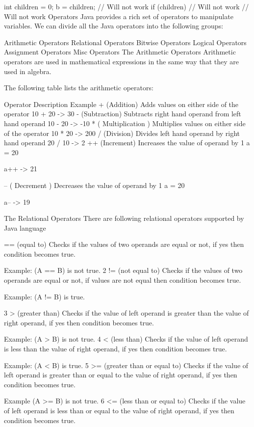 int children = 0;
b = children; // Will not work
if (children) { // Will not work
    // Will not work
}
Operators
Java provides a rich set of operators to manipulate variables. We can divide all the Java operators into the following groups:

Arithmetic Operators
Relational Operators
Bitwise Operators
Logical Operators
Assignment Operators
Misc Operators
The Arithmetic Operators
Arithmetic operators are used in mathematical expressions in the same way that they are used in algebra.

The following table lists the arithmetic operators:

Operator	Description	Example
+ (Addition)	Adds values on either side of the operator	10 + 20 -> 30
- (Subtraction)	Subtracts right hand operand from left hand operand	10 - 20 -> -10
* ( Multiplication )	Multiplies values on either side of the operator	10 * 20 -> 200
/ (Division)	Divides left hand operand by right hand operand	20 / 10 -> 2
++ (Increment)	Increases the value of operand by 1
a = 20

a++ -> 21

-- ( Decrement )	Decreases the value of operand by 1
a = 20

a-- -> 19

The Relational Operators
There are following relational operators supported by Java language

== (equal to) Checks if the values of two operands are equal or not, if yes then condition becomes true.

Example: (A == B) is not true. 2 != (not equal to) Checks if the values of two operands are equal or not, if values are not equal then condition becomes true.

Example: (A != B) is true.

3 > (greater than) Checks if the value of left operand is greater than the value of right operand, if yes then condition becomes true.

Example: (A > B) is not true. 4 < (less than) Checks if the value of left operand is less than the value of right operand, if yes then condition becomes true.

Example: (A < B) is true. 5 >= (greater than or equal to) Checks if the value of left operand is greater than or equal to the value of right operand, if yes then condition becomes true.

Example (A >= B) is not true. 6 <= (less than or equal to) Checks if the value of left operand is less than or equal to the value of right operand, if yes then condition becomes true.

